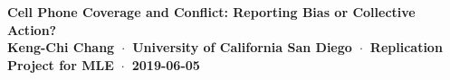 \documentclass[article,36pt,extrafontsizes,oneside,openany,oldfontcommands]{memoir}
\begin{document}
\begin{topbox}
  \color{titletextcol}
  \vspace{1.2in}
  \bfseries
  \fontsize{115pt}{115pt}\selectfont
  {Cell Phone Coverage and Conflict: Reporting Bias or Collective Action?}\\[0.75in]  %
  \color{authortextcol} 
  \mdseries
  \LARGE{Keng-Chi Chang~$\cdot$~University of California San Diego~$\cdot$~Replication Project for MLE~$\cdot$~2019-06-05} 
  \vspace{0.75in}
\end{topbox}




\fontsize{45pt}{55pt}\selectfont
\end{document}
